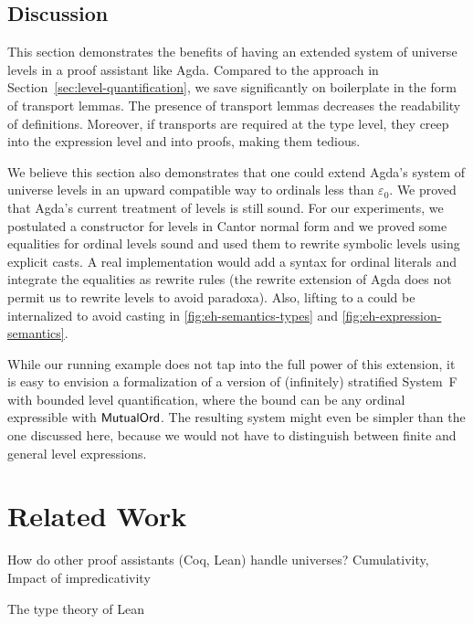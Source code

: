 \documentclass[manuscript,screen,review,anonymous]{acmart}
\begin{document}
\subsection{Discussion}
\label{sec:discussion-2}

This section demonstrates the benefits of having an extended system of
universe levels in a proof assistant like Agda. Compared to the
approach in Section~\cref{sec:level-quantification}, we save
significantly on boilerplate in the form of transport lemmas. The
presence of transport lemmas decreases the readability of
definitions. Moreover, if transports are required at the type level,
they creep into the expression level and into proofs, making them tedious.

We believe this section also demonstrates that one could extend Agda's
system of universe levels in an upward compatible way to ordinals less
than $\varepsilon_0$. We proved that Agda's current treatment of
levels is still sound. For our experiments, we postulated a
constructor for levels in Cantor normal form and we proved some
equalities for ordinal levels sound and used them to rewrite symbolic
levels using explicit casts. A real implementation would add a syntax
for ordinal literals and integrate the equalities as rewrite rules
(the rewrite extension of Agda does not permit us to rewrite levels to
avoid paradoxa). Also, lifting to a {\ABoundedLevel} could be
internalized to avoid casting in \cref{fig:eh-semantics-types} and
\cref{fig:eh-expression-semantics}. 


While our running example does not tap into the
full power of this extension, it is easy to envision a formalization
of a version of (infinitely) stratified System~F with bounded level quantification,
where the bound can be any ordinal expressible with $\AMutualOrd$. The
resulting system might even be simpler than the one discussed here,
because we would not have to distinguish between finite and general
level expressions.



\section{Related Work}
\label{sec:related-work}

How do other proof assistants (Coq, Lean) handle universes?
Cumulativity, Impact of impredicativity

The type theory of Lean \cite{carneiro19:_type_theor_lean}
\end{document}
